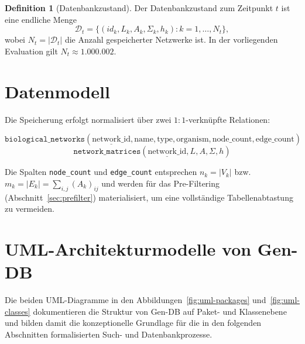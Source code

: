 \documentclass[a4paper,12pt, twoside]{report}
\theoremstyle{definition}
\newtheorem{definition}{Definition}
\begin{document}
\begin{definition}[Datenbankzustand]
	Der Datenbankzustand zum Zeitpunkt $t$ ist eine endliche Menge
	\[
	\mathcal{D}_t = \{(id_k, L_k, A_k, \Sigma_k, h_k) : k = 1,\ldots,N_t\},
	\]
	wobei $N_t = |\mathcal{D}_t|$ die Anzahl gespeicherter Netzwerke ist. In der vorliegenden Evaluation gilt $N_t \approx 1.000.002$.
\end{definition}

\section{Datenmodell}

Die Speicherung erfolgt normalisiert über zwei $1{:}1$-verknüpfte Relationen:

\[
\texttt{biological\_networks}(\underline{\text{network\_id}}, \text{name}, \text{type}, \text{organism}, \text{node\_count}, \text{edge\_count})
\]
\[
\texttt{network\_matrices}(\underline{\text{network\_id}}, L, A, \Sigma, h)
\]

Die Spalten \texttt{node\_count} und \texttt{edge\_count} entsprechen $n_k = |V_k|$ bzw. $m_k = |E_k| = \sum_{i,j} (A_k)_{ij}$ und werden für das Pre-Filtering (Abschnitt~\ref{sec:prefilter}) materialisiert, um eine vollständige Tabellenabtastung zu vermeiden.

\section{UML-Architekturmodelle von Gen-DB}
\label{sec:uml}

Die beiden UML-Diagramme in den Abbildungen~\ref{fig:uml-packages} und~\ref{fig:uml-classes} dokumentieren die Struktur von Gen-DB auf Paket- und Klassenebene und bilden damit die konzeptionelle Grundlage für die in den folgenden Abschnitten formalisierten Such- und Datenbankprozesse.
\end{document}
